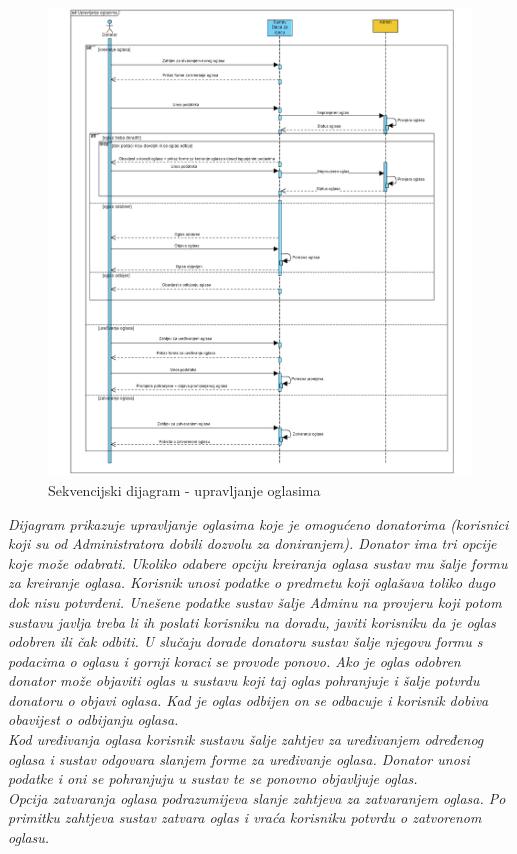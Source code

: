 				\begin{figure}[H]
						\includegraphics[width=\textwidth,height=0.7\textheight]{dijagrami/sqd_upr_ogl.png}
						\centering
						\caption{Sekvencijski dijagram - upravljanje oglasima}
						\label{fig:Upravljanje oglasima}
				\end{figure}
				\textit{Dijagram prikazuje upravljanje oglasima koje je omogućeno donatorima (korisnici koji su od Administratora dobili dozvolu za doniranjem). Donator ima tri opcije koje može odabrati. Ukoliko odabere opciju kreiranja oglasa sustav mu šalje formu za kreiranje oglasa. Korisnik unosi podatke o predmetu koji oglašava toliko dugo dok nisu potvrđeni. Unešene podatke sustav šalje Adminu na provjeru koji potom sustavu javlja treba li ih poslati korisniku na doradu, javiti korisniku da je oglas odobren ili čak odbiti. U slučaju dorade donatoru sustav šalje njegovu formu s podacima o oglasu i gornji koraci se provode ponovo. Ako je oglas odobren donator može objaviti oglas u sustavu koji taj oglas pohranjuje i šalje potvrdu donatoru o objavi oglasa. Kad je oglas odbijen on se odbacuje i korisnik dobiva obavijest o odbijanju oglasa. \\Kod uređivanja oglasa korisnik sustavu šalje zahtjev za uređivanjem određenog oglasa i sustav odgovara slanjem forme za uređivanje oglasa. Donator unosi podatke i oni se pohranjuju u sustav te se ponovno objavljuje oglas. \\Opcija zatvaranja oglasa podrazumijeva slanje zahtjeva za zatvaranjem oglasa. Po primitku zahtjeva sustav zatvara oglas i vraća korisniku potvrdu o zatvorenom oglasu. }

